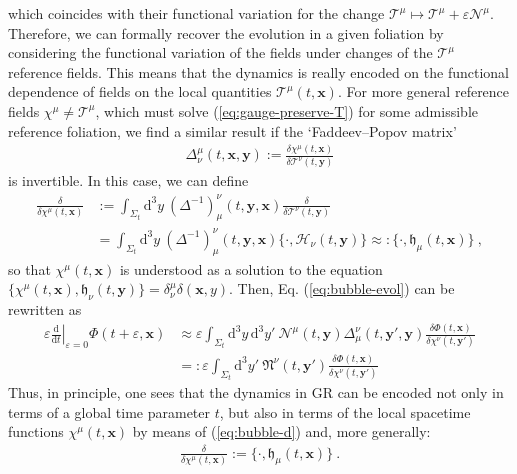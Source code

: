 \documentclass[12pt]{iopart}
\def\eq#1{\begin{equation}\begin{aligned}#1\end{aligned}\end{equation}}
\def\eref#1{(\ref{eq:#1})}
\def\D{\mathrm{d}}
\def\Del#1#2{\frac{\D#1}{\D#2}}
\def\x{\mathbf{x}}
\def\y{\mathbf{y}}
\begin{document}
which coincides with their functional variation for the change $\mathcal{T}^{\mu}\mapsto\mathcal{T}^{\mu}+\varepsilon\mathcal{N}^{\mu}$. Therefore, we can formally recover the evolution in a given foliation by considering the functional variation of the fields under changes of the $\mathcal{T}^{\mu}$ reference fields. This means that the dynamics is really encoded on the functional dependence of fields on the local quantities $\mathcal{T}^{\mu}(t,\x)$. For more general reference fields $\chi^{\mu}\neq\mathcal{T}^{\mu}$, which must solve \eref{gauge-preserve-T} for some admissible reference foliation, we find a similar result if the `Faddeev--Popov matrix'
\eq{\label{eq:FPmatrix}
\Delta^{\mu}_{\nu}(t,\x,\y) := \frac{\delta\chi^{\mu}(t,\x)}{\delta\mathcal{T}^{\nu}(t,\y)}
}
is invertible. In this case, we can define
\eq{\label{eq:bubble-d-chi}
\frac{\delta}{\delta\chi^{\mu}(t,\x)}&:= \int_{\Sigma_t}\D^3y\ (\Delta^{-1})^{\nu}_{\mu}(t,\y,\x)\frac{\delta}{\delta\mathcal{T}^{\nu}(t,\y)}\\
&= \int_{\Sigma_t}\D^3y\ (\Delta^{-1})^{\nu}_{\mu}(t,\y,\x)\{\cdot,\mathcal{H}_{\nu}(t,\y)\}\approx: \{\cdot,\mathfrak{h}_{\mu}(t,\x)\} \ ,
}
so that $\chi^{\mu}(t,\x)$ is understood as a solution to the equation $\{\chi^{\mu}(t,\x),\mathfrak{h}_{\nu}(t,\y)\} = \delta^{\mu}_{\nu}\delta(\x,y)$. Then, Eq. \eref{bubble-evol} can be rewritten as
\eq{\label{eq:bubble-evol-2}
\varepsilon\left.\Del{}{t}\right|_{\varepsilon=0} \Phi(t+\varepsilon,\x) &\approx  \varepsilon\int_{\Sigma_t}\D^3y\,\D^3y'\ \mathcal{N}^{\mu}(t,\y)\Delta^{\nu}_{\mu}(t,\y',\y)\frac{\delta\Phi(t,\x)}{\delta\chi^{\nu}(t,\y')}\\
&=: \varepsilon\int_{\Sigma_t}\D^3y'\ \mathfrak{N}^{\nu}(t,\y')\frac{\delta\Phi(t,\x)}{\delta\chi^{\nu}(t,\y')}
}
Thus, in principle, one sees that the dynamics in GR can be encoded not only in terms of a global time parameter $t$, but also in terms of the local spacetime functions $\chi^{\mu}(t,\x)$ by means of \eref{bubble-d} and, more generally:
\eq{\label{eq:bubble-d-gen}
\frac{\delta}{\delta\chi^{\mu}(t,\x)} := \{\cdot,\mathfrak{h}_{\mu}(t,\x)\} \ .
}
\end{document}
